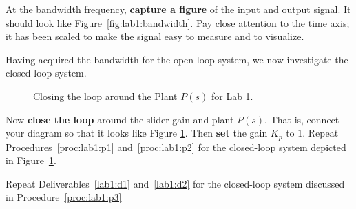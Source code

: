 %
\begin{deliverable}[label={lab1:d2}]
  At the bandwidth frequency,
  \textbf{capture a figure} of the input and output signal. It should look
  like Figure~\ref{fig:lab1:bandwidth}. Pay close attention to the time
  axis; it has been scaled to make the signal easy to measure and to visualize.
\end{deliverable}
%
Having acquired the bandwidth for the open loop system, we now investigate
the closed loop system.
%
\begin{figure}
  \centering
  \caption[Closed-Loop Diagram for Lab 1]{
    Closing the loop around the Plant \(P(s)\) for Lab 1.
  }
  \label{fig:lab1:closing-loop}
\end{figure}
%
\begin{procedure}[label={proc:lab1:p3}]
  Now \textbf{close the loop} around the slider gain and plant \(P(s).\) That
  is, connect your diagram so that it looks like Figure
  \ref{fig:lab1:closing-loop}. Then \textbf{set} the gain \(K_p\) to
  \(1.\)
  Repeat Procedures~\ref{proc:lab1:p1} and~\ref{proc:lab1:p2} for the
  closed-loop system depicted in Figure~\ref{fig:lab1:closing-loop}.
\end{procedure}
%
\begin{deliverable}[label={lab1:d3}]
  Repeat Deliverables~\ref{lab1:d1} and~\ref{lab1:d2} for the closed-loop
  system discussed in Procedure~\ref{proc:lab1:p3}
\end{deliverable}

